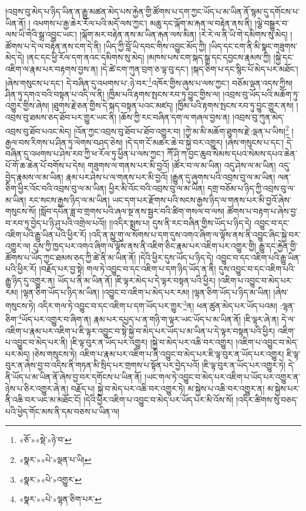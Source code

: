 །འབྲས་བུ་མེད་པ་ཉིད་ཡིན་ན་རྒྱུ་མཚན་མེད་པས་རྐྱེན་གྱི་ཚོགས་པ་དག་ཀྱང་ཡོད་པ་མ་ཡིན་ནོ་སྙམ་དུ་དགོངས་པ་ཡིན་ནོ། །
འཕགས་པ་རྒྱ་ཆེར་རོལ་པའི་མདོ་ལས་ཀྱང་། མཆུ་དང་ལྐོག་མ་རྐན་ལ་བརྟེན་ནས་ནི། །ལྕེ་བསྒྱུར་བ་ལས་ཡི་གེའི་སྒྲ་འབྱུང་ཡང་། །ལྐོག་མར་བརྟེན་ནས་མ་ཡིན་རྐན་ལས་མིན། །རེ་རེ་ལ་ནི་ཡི་གེ་དམིགས་སུ་མེད། །ཚོགས་པ་དེ་ལ་བརྟེན་ནས་ངག་དེ་ནི། །ཡིད་ཀྱི་བློ་ཡི་དབང་གིས་འབྱུང་མོད་ཀྱི། །ཡིད་དང་ངག་ནི་མི་སྣང་གཟུགས་མེད་དེ། །ནང་དང་ཕྱི་རོལ་དག་ནའང་དམིགས་སུ་མེད། །མཁས་པས་ངག་སྐད་སྒྲ་དང་དབྱངས་རྣམས་ཀྱི། །སྐྱེ་དང་འཇིག་ལ་རྣམ་པར་བརྟགས་བྱས་ན། །དེ་ཚེ་ངག་ཀུན་བྲག་ཅ་ལྟ་བུ་དང་། །སྐད་ཅིག་པ་དང་སྙིང་པོ་མེད་པར་མཐོང་། །ཞེས་གསུངས་པ་དང་། དེ་བཞིན་དུ་འཕགས་པ་:ཉེ་བར་\footnote{«ཅོ་»«སྡེ་»ཉེ་བ་}འཁོར་གྱིས་ཞུས་པ་ལས་ཀྱང་། བཅོམ་ལྡན་འདས་ཀྱིས། ཤིན་ཏུ་དགའ་བའི་བསྟན་པ་འདི་ལ་ནི། །ཁྱིམ་པའི་རྟགས་སྤངས་རབ་ཏུ་བྱུང་གྱིས་ལ། །འབྲས་བུ་ཡོད་པའི་མཆོག་ཏུ་འགྱུར་གྱིས་ཞེས། །ཐུགས་རྗེ་ཅན་གྱིས་དེ་སྐད་བསྟན་པའང་མཛད། །ཁྱིམ་པའི་རྟགས་སྤངས་རབ་ཏུ་བྱུང་གྱུར་ནས། །འབྲས་བུ་ཐམས་ཅད་ཐོབ་པར་གྱུར་ཡང་ནི། །ཆོས་ཀྱི་རང་བཞིན་དག་ལ་གཞལ་བྱས་ན། །འབྲས་བུ་ཀུན་མེད་འབྲས་བུ་ཐོབ་པའང་མེད། །འོན་ཀྱང་འབྲས་བུ་ཐོབ་པ་ཐོབ་འགྱུར་བ། །ཀྱེ་མ་མི་མཆོག་ཐུགས་རྗེ་:ལྡན་པ་ཡིས།\footnote{«སྣར་»«པེ་»ལྡན་པ་ཡི།} །རྒྱལ་བས་རིགས་པ་ཤིན་ཏུ་ལེགས་བཤད་ཅེས། །དེ་དག་ངོ་མཚར་ཆེ་བ་སྐྱེ་བར་འགྱུར། །ཞེས་གསུངས་པ་དང་། དེ་བཞིན་དུ་འཕགས་པ་ཤེས་རབ་ཀྱི་ཕ་རོལ་ཏུ་ཕྱིན་པ་ལས་ཀྱང་། ཀཽ་ཤི་ཀ་བྱང་ཆུབ་སེམས་དཔའ་སེམས་དཔའ་ཆེན་པོ་གོ་ཆ་ཆེན་པོ་བགོས་པ་དེས། གཟུགས་ལ་གནས་པར་མི་བྱའོ། །ཚོར་བ་ལ་མ་ཡིན། འདུ་ཤེས་ལ་མ་ཡིན། འདུ་བྱེད་རྣམས་ལ་མ་ཡིན། རྣམ་པར་ཤེས་པ་ལ་གནས་པར་མི་བྱའོ། །རྒྱུན་དུ་ཞུགས་པའི་འབྲས་བུ་ལ་མ་ཡིན། ལན་ཅིག་ཕྱིར་འོང་བའི་འབྲས་བུ་ལ་མ་ཡིན། ཕྱིར་མི་འོང་བའི་འབྲས་བུ་ལ་མ་ཡིན། དགྲ་བཅོམ་པ་ཉིད་ཀྱི་འབྲས་བུ་ལ་མ་ཡིན། རང་སངས་རྒྱས་ཉིད་ལ་མ་ཡིན། ཡང་དག་པར་རྫོགས་པའི་སངས་རྒྱས་ཉིད་ལ་གནས་པར་མི་བྱའོ་ཞེས་གསུངས་སོ། །སློབ་དཔོན་ཟླ་བ་གྲགས་པའི་ཞལ་སྔ་ནས་སྦྱར་བའི་ཚིག་གསལ་བ་ལས། ཚོགས་པ་བརྟག་པ་ཞེས་བྱ་བ་རབ་ཏུ་བྱེད་པ་ཉི་ཤུ་པའི་འགྲེལ་པའོ།། །།འདིར་སྨྲས་པ། དུས་ནི་རང་བཞིན་གྱིས་ཡོད་པ་ཉིད་དེ། འབྱུང་བ་དང་འཇིག་པའི་རྒྱུ་ཡིན་པའི་ཕྱིར་རོ། །འདི་ན་མྱུ་གུ་ལ་སོགས་པ་དག་དུས་འགའ་ཞིག་ལ་ལྟོས་ནས་ནི་འབྱུང་ཞིང་སྐྱེ་བར་འགྱུར་ལ། དུས་ཀྱི་ཁྱད་པར་འགའ་ཞིག་ལ་ལྟོས་ནས་ནི་འཇིག་ཅིང་རྣམ་པར་འཇིག་པར་འགྱུར་གྱི། རྒྱུ་དང་རྐྱེན་གྱི་ཚོགས་པ་ཡོད་ཀྱང་ཐམས་ཅད་ཀྱི་ཚེ་ནི་མ་ཡིན་ནོ། །དེའི་ཕྱིར་དུས་ཡོད་པ་ཉིད་དེ། འབྱུང་བ་དང་འཇིག་པའི་རྒྱུ་ཡིན་པའི་ཕྱིར་རོ། །བརྗོད་པར་བྱ་སྟེ། གལ་ཏེ་འབྱུང་བ་དང་འཇིག་པ་དག་ཉིད་ཡོད་ན་ནི། དུས་འབྱུང་བ་དང་འཇིག་པའི་རྒྱུ་ཉིད་དུ་འགྱུར་ན། ཡོད་པ་ནི་མ་ཡིན་ནོ། །ཇི་ལྟར་མེད་པ་དེ་ལྟར་བསྟན་པའི་ཕྱིར། །འཇིག་པ་འབྱུང་བ་མེད་པར་རམ། །ལྷན་ཅིག་ཡོད་པ་ཉིད་མ་ཡིན། །འབྱུང་བ་འཇིག་པ་མེད་པར་རམ། །ལྷན་ཅིག་ཡོད་པ་ཉིད་མ་ཡིན། །ཞེས་གསུངས་ཏེ། འདིར་གལ་ཏེ་འབྱུང་བ་དང་འཇིག་པ་དག་ཡོད་པར་གྱུར་\footnote{«སྣར་»«པེ་»འགྱུར་}ན། ཕན་ཚུན་མེད་པར་ཡོད་པའམ། :ལྷན་ཅིག་\footnote{«སྣར་»«པེ་»ལྷན་ཅིག་པར་}ཡོད་པར་འགྱུར་བ་ཞིག་ན། རྣམ་པར་དཔྱད་པ་ན་གཉི་ག་ལྟར་ཡང་ཡོད་པ་མ་ཡིན་ནོ། །ཇི་ལྟར་ཞེ་ན། དེ་ལ་འཇིག་པ་རྣམ་པར་འཇིག་པ་ཇི་ལྟར་འབྱུང་བ་སྟེ་སྐྱེ་བ་མེད་པར་ཡོད་པ་མ་ཡིན་པ་དེ་ལྟར་བསྟན་པའི་ཕྱིར། འཇིག་པ་འབྱུང་བ་མེད་པར་ནི། །ཇི་ལྟ་བུར་ན་ཡོད་པར་འགྱུར། །སྐྱེ་བ་མེད་པར་འཆི་བར་འགྱུར། །འཇིག་པ་འབྱུང་བ་མེད་པར་མེད། །ཅེས་གསུངས་ཏེ། འཇིག་པ་རྣམ་པར་འཇིག་པ་ནི་འབྱུང་བ་མེད་པར་ཇི་ལྟ་བུར་ན་ཡོད་པར་འགྱུར། ཇི་ལྟ་བུར་ན་ཞེས་བྱ་བ་འདིས་ནི་གཏན་མི་སྲིད་པར་གྲགས་པ་སྟོན་པར་བྱེད་པའོ། །ཇི་ལྟ་བུར་ན་ཡོད་པར་འགྱུར་ཏེ། དེ་ནི་ཡོད་པ་མ་ཡིན་ནོ་ཞེས་བྱ་བར་དགོངས་པ་ཡིན་ནོ། །ཡང་གལ་ཏེ་འབྱུང་བ་མེད་པར་འཇིག་པ་ཡོད་པར་འགྱུར་ན་ཉེས་པ་ཅིར་འགྱུར་ཞེ་ན། བརྗོད་པ། སྐྱེ་བ་མེད་པར་འཆི་བར་འགྱུར་ཏེ། མ་སྐྱེས་པ་འཆི་བར་འགྱུར་ན། མ་སྐྱེས་པར་ནི་འཆི་བར་ཡང་མ་མཐོང་ངོ། །དེའི་ཕྱིར་འཇིག་པ་འབྱུང་བ་མེད་པར་ཡོད་པར་མི་འོས་སོ། །འདིར་ཚིགས་སུ་བཅད་པའི་ཕྱེད་གོང་མས་ནི་དམ་བཅས་པ་ཡིན་ལ། 
